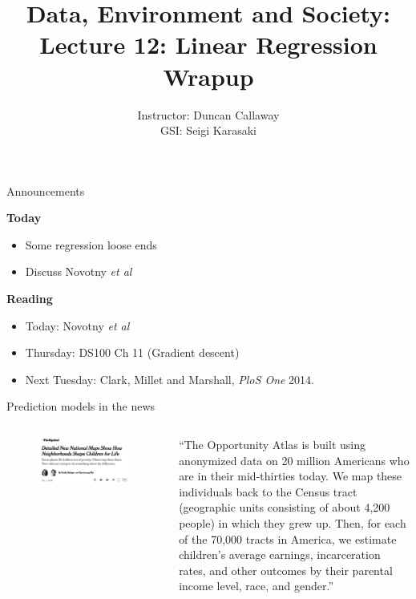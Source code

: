 \documentclass[aspectratio=169]{beamer}
\title[Lecture 12: Regression wrapup] %
{Data, Environment and Society: \\{Lecture 12: Linear Regression Wrapup}}
\author[ER190C: Data, Environment and Society] 
{Instructor: Duncan Callaway\\
GSI: Seigi Karasaki}
\institute[UC Berkeley] %
 {\small{ \bf October 2, 2018}}
\date[October 2, 2018]
\begin{document}
\begin{frame}
  \titlepage
\end{frame}

\begin{frame}{Announcements}

\textbf{Today}
\begin{itemize}
\item Some regression loose ends
\item Discuss Novotny \textit{et al}
\end{itemize}

\textbf{Reading}
\begin{itemize}
\item Today: Novotny \textit{et al}
\item Thursday: DS100 Ch 11 (Gradient descent)
\item Next Tuesday: Clark, Millet and Marshall, \textit{PloS One} 2014.
\end{itemize}
\end{frame}


\begin{frame}{Prediction models in the news}

\begin{columns}
\begin{figure}
\includegraphics[width=\textwidth]{NYT_poverty_maps}
\caption*{}
\end{figure}
``The Opportunity Atlas is built using anonymized data on 20 million Americans who are in their mid-thirties today. We map these individuals back to the Census tract (geographic units consisting of about 4,200 people) in which they grew up. Then, for each of the 70,000 tracts in America, we estimate children's average earnings, incarceration rates, and other outcomes by their parental income level, race, and gender.''
\end{columns}
\end{frame}
\end{document}
